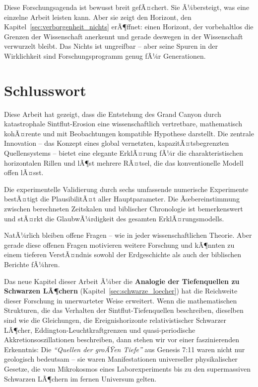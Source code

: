 ﻿\documentclass[12pt,a4paper]{report}
\begin{document}
Diese Forschungsagenda ist bewusst breit gefÃ¤chert. Sie Ã¼bersteigt, was eine einzelne Arbeit leisten kann. Aber sie zeigt den Horizont, den Kapitel~\ref{sec:verborgenheit_nichts} erÃ¶ffnet: einen Horizont, der vorbehaltlos die Grenzen der Wissenschaft anerkennt und gerade deswegen in der Wissenschaft verwurzelt bleibt. Das Nichts ist ungreifbar -- aber seine Spuren in der Wirklichkeit sind Forschungsprogramm genug fÃ¼r Generationen.

\section{Schlusswort}

Diese Arbeit hat gezeigt, dass die Entstehung des Grand Canyon durch katastrophale Sintflut-Erosion eine wissenschaftlich vertretbare, mathematisch kohÃ¤rente und mit Beobachtungen kompatible Hypothese darstellt. Die zentrale Innovation -- das Konzept eines global vernetzten, kapazitÃ¤tsbegrenzten Quellensystems -- bietet eine elegante ErklÃ¤rung fÃ¼r die charakteristischen horizontalen Rillen und lÃ¶st mehrere RÃ¤tsel, die das konventionelle Modell offen lÃ¤sst.

Die experimentelle Validierung durch sechs umfassende numerische Experimente bestÃ¤\-tigt die PlausibilitÃ¤t aller Hauptparameter. Die Ãœbereinstimmung zwischen berechneten Zeitskalen und biblischer Chronologie ist bemerkenswert und stÃ¤rkt die GlaubwÃ¼rdigkeit des gesamten ErklÃ¤rungsmodells.

NatÃ¼rlich bleiben offene Fragen -- wie in jeder wissenschaftlichen Theorie. Aber gerade diese offenen Fragen motivieren weitere Forschung und kÃ¶nnten zu einem tieferen VerstÃ¤ndnis sowohl der Erdgeschichte als auch der biblischen Berichte fÃ¼hren.

\medskip

Das neue Kapitel dieser Arbeit Ã¼ber die \textbf{Analogie der Tiefenquellen zu Schwarzen LÃ¶chern} (Kapitel~\ref{sec:schwarze_loecher}) hat die Reichweite dieser Forschung in unerwarteter Weise erweitert. Wenn die mathematischen Strukturen, die das Verhalten der Sintflut-Tiefenquellen beschreiben, dieselben sind wie die Gleichungen, die Ereignishorizonte relativistischer Schwarzer LÃ¶cher, Eddington-Leuchtkraftgrenzen und quasi-periodische Akkretionsoszillationen beschreiben, dann stehen wir vor einer faszinierenden Erkenntnis: Die \textit{``Quellen der groÃŸen Tiefe''} aus Genesis 7:11 waren nicht nur geologisch bedeutsam -- sie waren Manifestationen universeller physikalischer Gesetze, die vom Mikrokosmos eines Laborexperiments bis zu den supermassiven Schwarzen LÃ¶chern im fernen Universum gelten.
\end{document}
